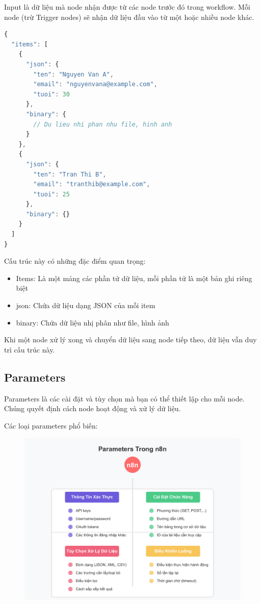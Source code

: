 Input là dữ liệu mà node nhận được từ các node trước đó trong workflow. Mỗi node (trừ Trigger nodes) sẽ nhận dữ liệu đầu vào từ một hoặc nhiều node khác.

\begin{lstlisting}[language = Javascript]
{
  "items": [
    {
      "json": {
        "ten": "Nguyen Van A",
        "email": "nguyenvana@example.com",
        "tuoi": 30
      },
      "binary": {
        // Du lieu nhi phan nhu file, hinh anh
      }
    },
    {
      "json": {
        "ten": "Tran Thi B",
        "email": "tranthib@example.com",
        "tuoi": 25
      },
      "binary": {}
    }
  ]
}
\end{lstlisting}
Cấu trúc này có những đặc điểm quan trọng:
\begin{itemize}
    \item Items: Là một mảng các phần tử dữ liệu, mỗi phần tử là một bản ghi riêng biệt
    \item json: Chứa dữ liệu dạng JSON của mỗi item
    \item binary: Chứa dữ liệu nhị phân như file, hình ảnh
\end{itemize}

Khi một node xử lý xong và chuyển dữ liệu sang node tiếp theo, dữ liệu vẫn duy trì cấu trúc này.

\clearpage
\subsection{Parameters}
Parameters là các cài đặt và tùy chọn mà bạn có thể thiết lập cho mỗi node. Chúng quyết định cách node hoạt động và xử lý dữ liệu.

Các loại parameters phổ biến:

\begin{figure}[htbp]
    \centering
    \includegraphics[width=1\linewidth]{Chap1-7/parameters.pdf}
\end{figure}

